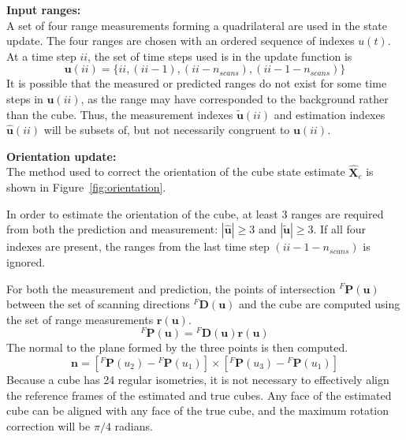 		\textbf{Input ranges:}\\
			A set of four range measurements forming a quadrilateral are used in the state update. The four ranges are chosen with an ordered sequence of indexes $u(t)$. At a time step $ii$, the set of time steps used is in the update function is
			\begin{equation}
				\mathbf{u}(ii) = \{ii,(ii-1),(ii-n_{scans}),(ii-1-n_{scans})\}
			\end{equation}
			It is possible that the measured or predicted ranges do not exist for some time steps in $\mathbf{u}(ii)$, as the range may have corresponded to the background rather than the cube.
			Thus, the measurement indexes $\tilde{\mathbf{u}}(ii)$ and estimation indexes $\hat{\mathbf{u}}(ii)$ will be subsets of, but not necessarily congruent to $\mathbf{u}(ii)$.
			
		\textbf{Orientation update:}\\
			The method used to correct the orientation of the cube state estimate $\hat{\mathbf{X}}_c$ is shown in Figure~\ref{fig:orientation}. 
						
			In order to estimate the orientation of the cube, at least 3 ranges are required from both the prediction and measurement:
			$|\hat{\mathbf{u}}| \geq 3$ and $|\tilde{\mathbf{u}}| \geq 3$. If all four indexes are present, the ranges from the last time step $(ii-1-n_{scans})$ is ignored.
	
			For both the measurement and prediction, the points of intersection $^{F}\mathbf{P}(\mathbf{u})$ between the set of scanning directions ${^{F}\mathbf{D}(\mathbf{u})}$ and the cube are computed using the set of range measurements $\mathbf{r}(\mathbf{u})$.
			\begin{equation} \label{eq:points}
				^{F}\mathbf{P}(\mathbf{u}) = {^{F}\mathbf{D}(\mathbf{u})}\mathbf{r}(\mathbf{u})
			\end{equation}
			The normal to the plane formed by the three points is then computed.
			\begin{equation}
				\mathbf{n} = [{^{F}\mathbf{P}}(u_2) - {^{F}\mathbf{P}}(u_1)] \times [{^{F}\mathbf{P}}(u_3) - {^{F}\mathbf{P}}(u_1)]
			\end{equation}
			Because a cube has 24 regular isometries, it is not necessary to effectively align the reference frames of the estimated and true cubes. Any face of the estimated cube can be aligned with any face of the true cube, and the maximum rotation correction will be $\pi/4$ radians.

